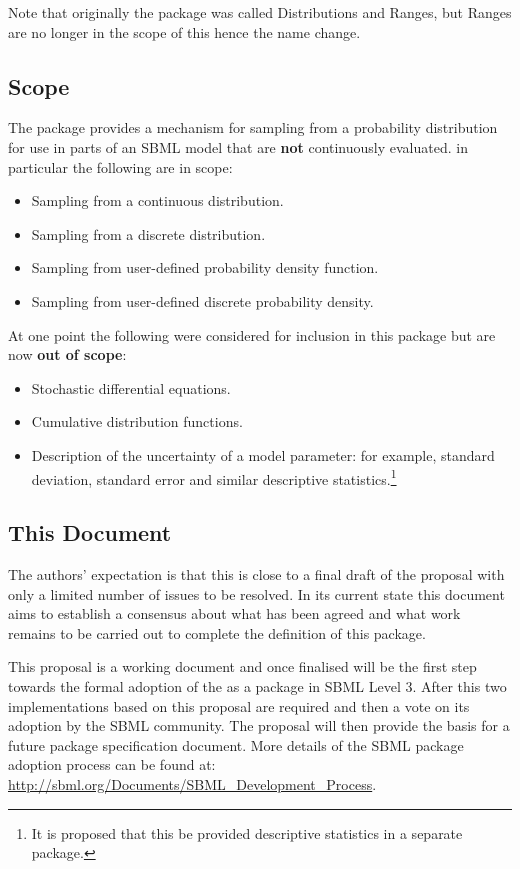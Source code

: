 \documentclass[draftspec]{sbmlpkgspec}
\begin{document}
Note that originally the package was called Distributions and Ranges,
but Ranges are no longer in the scope of this hence the name change.

\subsection{Scope}

The \distrib package provides a mechanism for sampling from a
probability distribution for use in parts of an SBML model that are
\textbf{not} continuously evaluated. in particular the following are
in scope:

\begin{itemize}
\item Sampling from a continuous distribution.
\item Sampling from a discrete distribution.
\item Sampling from user-defined probability density function.
\item Sampling from user-defined discrete probability density.
\end{itemize}

At one point the following were considered for inclusion in this
package but are now \textbf{out of scope}:

\begin{itemize}
\item Stochastic differential equations.
\item Cumulative distribution functions.
\item Description of the uncertainty of a model parameter: for
  example, standard deviation, standard error and similar descriptive
  statistics.\footnote{It is proposed that this be provided
    descriptive statistics in a separate package.}
\end{itemize}

\subsection{This Document}

The authors' expectation is that this is close to a final draft of the
proposal with only a limited number of issues to be resolved. In its
current state this document aims to establish a consensus about what
has been agreed and what work remains to be carried out to complete
the definition of this package.

This proposal is a working document and once finalised will be the
first step towards the formal adoption of the \distribshort as a
package in SBML Level 3. After this two implementations based on this
proposal are required and then a vote on its adoption by the SBML
community. The proposal will then provide the basis for a future
package specification document. More details of the SBML package
adoption process can be found at:
\url{http://sbml.org/Documents/SBML_Development_Process}.
\end{document}
